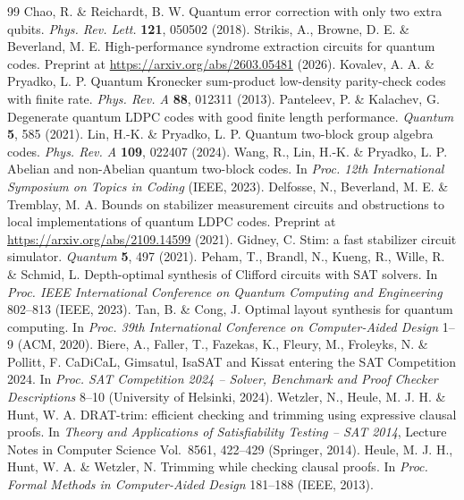 \documentclass[reprint,twocolumn,superscriptaddress,nofootinbib]{revtex4-2}
\theoremstyle{plain}
\begin{document}
\begin{thebibliography}{99}
 Chao, R. \& Reichardt, B. W. Quantum error correction with only two extra qubits. \emph{Phys. Rev. Lett.} \textbf{121}, 050502 (2018).
 Strikis, A., Browne, D. E. \& Beverland, M. E. High-performance syndrome extraction circuits for quantum codes. Preprint at \url{https://arxiv.org/abs/2603.05481} (2026).
 Kovalev, A. A. \& Pryadko, L. P. Quantum Kronecker sum-product low-density parity-check codes with finite rate. \emph{Phys. Rev. A} \textbf{88}, 012311 (2013).
 Panteleev, P. \& Kalachev, G. Degenerate quantum LDPC codes with good finite length performance. \emph{Quantum} \textbf{5}, 585 (2021).
 Lin, H.-K. \& Pryadko, L. P. Quantum two-block group algebra codes. \emph{Phys. Rev. A} \textbf{109}, 022407 (2024).
 Wang, R., Lin, H.-K. \& Pryadko, L. P. Abelian and non-Abelian quantum two-block codes. In \emph{Proc. 12th International Symposium on Topics in Coding} (IEEE, 2023).
 Delfosse, N., Beverland, M. E. \& Tremblay, M. A. Bounds on stabilizer measurement circuits and obstructions to local implementations of quantum LDPC codes. Preprint at \url{https://arxiv.org/abs/2109.14599} (2021).
 Gidney, C. Stim: a fast stabilizer circuit simulator. \emph{Quantum} \textbf{5}, 497 (2021).
 Peham, T., Brandl, N., Kueng, R., Wille, R. \& Schmid, L. Depth-optimal synthesis of Clifford circuits with SAT solvers. In \emph{Proc. IEEE International Conference on Quantum Computing and Engineering} 802--813 (IEEE, 2023).
 Tan, B. \& Cong, J. Optimal layout synthesis for quantum computing. In \emph{Proc. 39th International Conference on Computer-Aided Design} 1--9 (ACM, 2020).
 Biere, A., Faller, T., Fazekas, K., Fleury, M., Froleyks, N. \& Pollitt, F. CaDiCaL, Gimsatul, IsaSAT and Kissat entering the SAT Competition 2024. In \emph{Proc. SAT Competition 2024 -- Solver, Benchmark and Proof Checker Descriptions} 8--10 (University of Helsinki, 2024).
 Wetzler, N., Heule, M. J. H. \& Hunt, W. A. DRAT-trim: efficient checking and trimming using expressive clausal proofs. In \emph{Theory and Applications of Satisfiability Testing -- SAT 2014}, Lecture Notes in Computer Science Vol.~8561, 422--429 (Springer, 2014).
 Heule, M. J. H., Hunt, W. A. \& Wetzler, N. Trimming while checking clausal proofs. In \emph{Proc. Formal Methods in Computer-Aided Design} 181--188 (IEEE, 2013).

\end{thebibliography}
\end{document}
